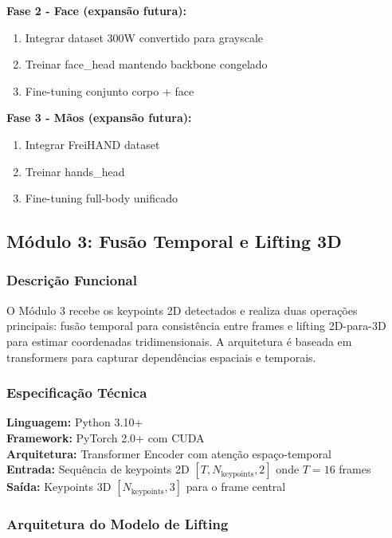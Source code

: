\documentclass[12pt, a4paper]{article}
\begin{document}
\textbf{Fase 2 - Face (expansão futura):}
\begin{enumerate}
    \item Integrar dataset 300W convertido para grayscale
    \item Treinar face\_head mantendo backbone congelado
    \item Fine-tuning conjunto corpo + face
\end{enumerate}

\textbf{Fase 3 - Mãos (expansão futura):}
\begin{enumerate}
    \item Integrar FreiHAND dataset
    \item Treinar hands\_head
    \item Fine-tuning full-body unificado
\end{enumerate}

\subsection{Módulo 3: Fusão Temporal e Lifting 3D}

\subsubsection{Descrição Funcional}

O Módulo 3 recebe os keypoints 2D detectados e realiza duas operações principais: fusão temporal para consistência entre frames e lifting 2D-para-3D para estimar coordenadas tridimensionais. A arquitetura é baseada em transformers para capturar dependências espaciais e temporais.

\subsubsection{Especificação Técnica}

\textbf{Linguagem:} Python 3.10+\\
\textbf{Framework:} PyTorch 2.0+ com CUDA\\
\textbf{Arquitetura:} Transformer Encoder com atenção espaço-temporal\\
\textbf{Entrada:} Sequência de keypoints 2D $[T, N_{\mathrm{keypoints}}, 2]$ onde $T=16$ frames\\
\textbf{Saída:} Keypoints 3D $[N_{\mathrm{keypoints}}, 3]$ para o frame central

\subsubsection{Arquitetura do Modelo de Lifting}
\end{document}
